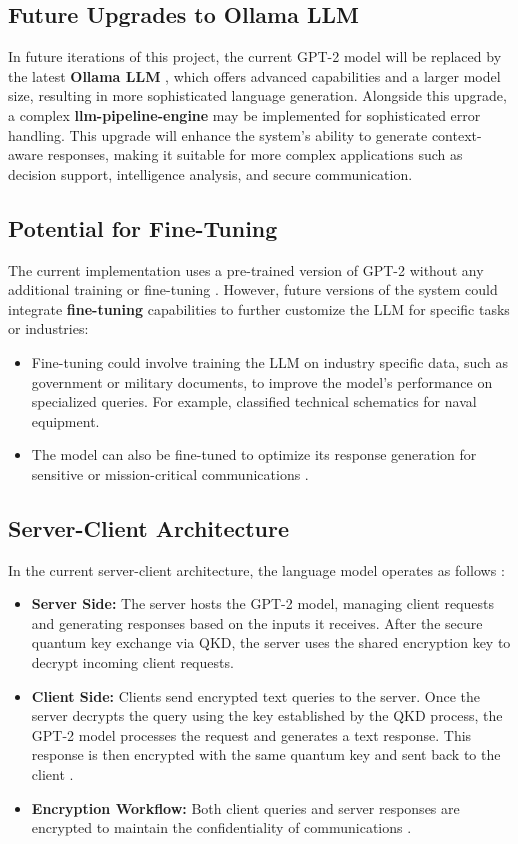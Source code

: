 \documentclass{article}
\begin{document}
\subsection{Future Upgrades to Ollama LLM}
In future iterations of this project, the current GPT-2 model will be replaced by the latest \textbf{Ollama LLM} \parencite{huggingface_llm_2024}, which offers advanced capabilities and a larger model size, resulting in more sophisticated language generation. Alongside this upgrade, a complex \textbf{llm-pipeline-engine} may be implemented for sophisticated error handling. This upgrade will enhance the system’s ability to generate context-aware responses, making it suitable for more complex applications such as decision support, intelligence analysis, and secure communication.

\subsection{Potential for Fine-Tuning}
The current implementation uses a pre-trained version of GPT-2 without any additional training or fine-tuning \parencite{jalammar_gpt2_illustration_2024}. However, future versions of the system could integrate \textbf{fine-tuning} capabilities to further customize the LLM for specific tasks or industries:
\begin{itemize}
    \item Fine-tuning could involve training the LLM on industry specific data, such as government or military documents, to improve the model's performance on specialized queries. For example, classified technical schematics for naval equipment. 
    \item The model can also be fine-tuned to optimize its response generation for sensitive or mission-critical communications \parencite{huggingface_llm_2024}.
\end{itemize}

\subsection{Server-Client Architecture}
In the current server-client architecture, the language model operates as follows \parencite{mlabonne_llm_course_2024}:
\begin{itemize}
    \item \textbf{Server Side:} The server hosts the GPT-2 model, managing client requests and generating responses based on the inputs it receives. After the secure quantum key exchange via QKD, the server uses the shared encryption key to decrypt incoming client requests.
    \item \textbf{Client Side:} Clients send encrypted text queries to the server. Once the server decrypts the query using the key established by the QKD process, the GPT-2 model processes the request and generates a text response. This response is then encrypted with the same quantum key and sent back to the client \parencite{huggingface_gpt2_2024}.
    \item \textbf{Encryption Workflow:} Both client queries and server responses are encrypted to maintain the confidentiality of communications \parencite{semaphoreci_llms_2024}.
\end{itemize}
\end{document}

